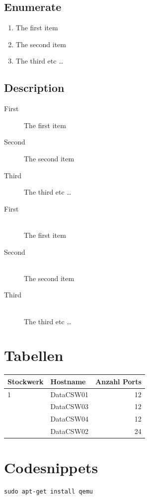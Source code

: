 \documentclass[a4,12pt]{scrartcl}
\begin{document}
\subsection{Enumerate}
\begin{enumerate}
  \item The first item
  \item The second item
  \item The third etc \ldots
\end{enumerate}

\subsection{Description}
\begin{description}
  \item[First] The first item
  \item[Second] The second item
  \item[Third] The third etc \ldots
\end{description}
\begin{description}
  \item[First] \hfill \\
  The first item
  \item[Second] \hfill \\
  The second item
  \item[Third] \hfill \\
  The third etc \ldots
\end{description}

\section{Tabellen}
\begin{center}
    \begin{tabular}{@{} l l r@{}}\toprule    
    {Stockwerk} & {Hostname} & {Anzahl Ports}\\ \midrule
    1 & DataCSW01 & 12\\ \addlinespace
    & DataCSW03 & 12\\ \addlinespace
    & DataCSW04 & 12\\ \addlinespace
    2& DataCSW02 & 24\\
    \bottomrule
    \end{tabular}
\end{center}

\section{Codesnippets}
\begin{lstlisting}
sudo apt-get install qemu
\end{lstlisting}
\end{document}
